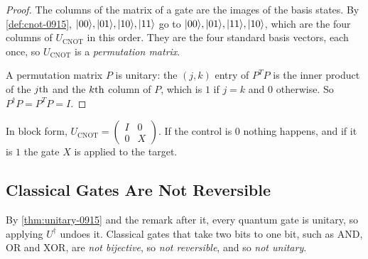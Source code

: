 \begin{proof}
%
%
    The columns of the matrix of a gate are the images of the basis states. By \cref{def:cnot-0915},
    $\lvert 00 \rangle, \lvert 01 \rangle, \lvert 10 \rangle, \lvert 11 \rangle$ go to $\lvert 00 \rangle, \lvert 01 \rangle, \lvert 11 \rangle, \lvert 10 \rangle$, which
    are the four columns of $U_{\mathrm{CNOT}}$ in this order. They are the four standard basis
    vectors, each once, so $U_{\mathrm{CNOT}}$ is a \emph{permutation matrix}.

    A permutation matrix $P$ is unitary: the $(j, k)$ entry of $P^T P$ is the inner product of the
    $j\text{th}$ and the $k\text{th}$ column of $P$, which is $1$ if $j = k$ and $0$ otherwise. So
    $P^\dagger P = P^T P = I$.
\end{proof}

In block form, $U_{\mathrm{CNOT}} = \begin{pmatrix} I & 0 \\ 0 & X \end{pmatrix}$. If the control is
$0$ nothing happens, and if it is $1$ the gate $X$ is applied to the target.

\subsection{Classical Gates Are Not Reversible}

By \cref{thm:unitary-0915} and the remark after it, every quantum gate is unitary, so applying
$U^\dagger$ undoes it. Classical gates that take two bits to one bit, such as AND, OR and XOR, are
\emph{not bijective}, so \emph{not reversible}, and so \emph{not unitary}.

